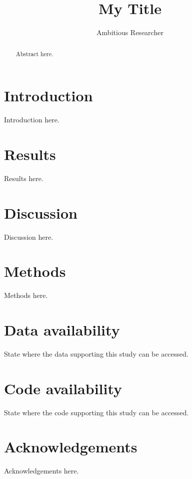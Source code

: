 \documentclass[12pt]{article}
\title{My Title}
\author{Ambitious Researcher}
\date{}
\begin{document}
\maketitle

\begin{abstract}
Abstract here.
\end{abstract}

\section{Introduction}
\label{sec:introduction}
Introduction here.

\section{Results}
\label{sec:results}
Results here.

\section{Discussion}
\label{sec:discussion}
Discussion here.

\section{Methods}
\label{sec:methods}
Methods here.

\section*{Data availability}
State where the data supporting this study can be accessed.

\section*{Code availability}
State where the code supporting this study can be accessed.

\section*{Acknowledgements}
Acknowledgements here.
\end{document}
